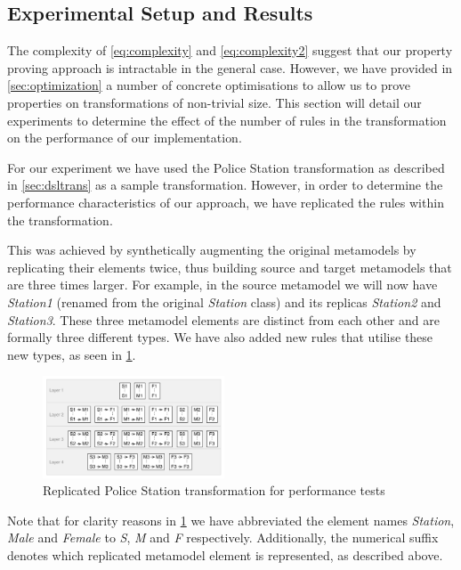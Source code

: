 \subsection{Experimental Setup and Results}

The complexity of \cref{eq:complexity} and \cref{eq:complexity2} suggest that our property proving
approach is intractable in the general case. However, we have provided in \cref{sec:optimization} a number
of concrete optimisations to allow us to prove properties on transformations of
non-trivial size. This section will detail our experiments to determine the
effect of the number of rules in the transformation on the performance of our
implementation.

For our experiment we have used the Police Station transformation as described
in \cref{sec:dsltrans} as a sample transformation. However, in order to
determine the performance characteristics of our approach, we have replicated
the rules within the transformation.

This was achieved by synthetically augmenting the original metamodels by
replicating their elements twice, thus building source and
target metamodels that are three times larger. For example, in the source
metamodel we will now have \emph{Station1} (renamed from the original
\emph{Station} class) and its replicas \emph{Station2} and \emph{Station3}.
These three metamodel elements are distinct from each other and are formally
three different types. We have also added new rules that utilise these new
types, as seen in \cref{fig:replicated_police_station_trafo}.

\begin{figure}[bht] \centering \includegraphics[width=0.48\textwidth]{./figures/policestation_dsltrans/3runtransformation.pdf}
	\caption{Replicated Police Station transformation for performance tests}
	\label{fig:replicated_police_station_trafo}
\end{figure}

Note that for clarity reasons in
\cref{fig:replicated_police_station_trafo} we have abbreviated the element
names \emph{Station}, \emph{Male} and \emph{Female} to \emph{S}, \emph{M} and
\emph{F} respectively. Additionally, the numerical suffix denotes which
replicated metamodel element is represented, as described above.



